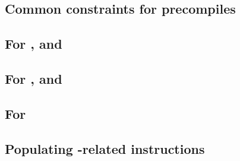 \subsection{Common constraints for precompiles}                            \label{oob: precompiles: common precompiles: generalities}           \newpage
\subsection{For \oobInstEcrecover{}, \oobInstEcadd{} and \oobInstEcmul{}}  \label{oob: precompiles: common precompiles: one row precompiles}             \newpage
\subsection{For \oobInstShaTwo{}, \oobInstRipemd{} and \oobInstIdentity{}} \label{oob: precompiles: common precompiles: two row precompiles}             \newpage
\subsection{For \oobInstEcpairing{}}                                       \label{oob: precompiles: common precompiles: three row precompiles}           \newpage
\subsection{Populating -related \oobMod{} instructions}          \label{oob: precompiles: common precompiles: bls}                      \newpage                        
